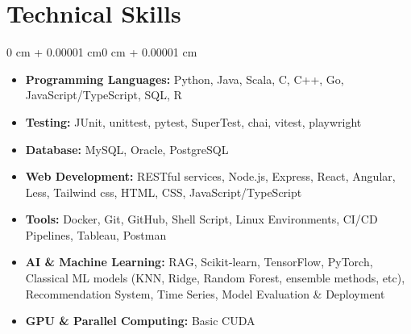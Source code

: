 \documentclass[10pt, letterpaper]{article}
\newenvironment{highlights}{
    \begin{itemize}[
        topsep=0.10 cm,
        parsep=0.10 cm,
        partopsep=0pt,
        itemsep=0pt,
        leftmargin=0 cm + 10pt
    ]
}{
    \end{itemize}
}
\newenvironment{onecolentry}{
    \begin{adjustwidth}{0 cm + 0.00001 cm}{0 cm + 0.00001 cm}
}{
    \end{adjustwidth}
}
\newenvironment{twocolentry}[2][]{
    \onecolentry
    \def\secondColumn{#2}
    \setcolumnwidth{\fill, 4.5 cm}
    \begin{paracol}{2}
}{
    \switchcolumn \raggedleft \secondColumn
    \end{paracol}
    \endonecolentry
}
\begin{document}

    \vspace{0.2 cm}

    \section{Technical Skills}
    
    \vspace{0.10 cm}
    \begin{onecolentry}
        \begin{highlights}
            \item \textbf{Programming Languages:} Python, Java, Scala, C, C++, Go, JavaScript/TypeScript, SQL, R
            \item \textbf{Testing:} JUnit, unittest, pytest, SuperTest, chai, vitest, playwright
            \item \textbf{Database:} MySQL, Oracle, PostgreSQL
            \item \textbf{Web Development:} RESTful services, Node.js, Express, React, Angular, Less, Tailwind css, HTML, CSS, JavaScript/TypeScript
            \item \textbf{Tools:} Docker, Git, GitHub, Shell Script, Linux Environments, CI/CD Pipelines, Tableau, Postman
            \item \textbf{AI \& Machine Learning:} RAG, Scikit-learn, TensorFlow, PyTorch, 
            Classical ML models (KNN, Ridge, Random Forest, ensemble methods, etc), Recommendation System, 
            Time Series, Model Evaluation \& Deployment
            \item \textbf{GPU \& Parallel Computing:} Basic CUDA
        \end{highlights}
    \end{onecolentry}
    
\end{document}
